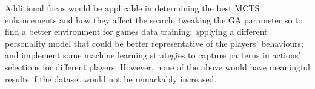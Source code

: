 Additional focus would be applicable in determining the best MCTS enhancements and how they affect the search; tweaking the GA parameter so to find a better environment for games data training; applying a different personality model that could be better representative of the players' behaviours; and implement some machine learning strategies to capture patterns in actions' selections for different players. However, none of the above would have meaningful results if the dataset would not be remarkably increased.
